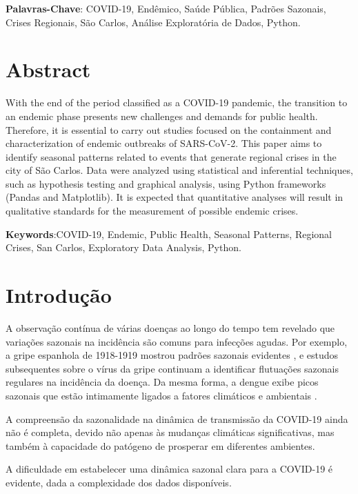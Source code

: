 \documentclass[a4paper,12pt]{report}
\begin{document}
\vspace{0.5cm}
\noindent \textbf{Palavras-Chave}: COVID-19, Endêmico, Saúde Pública, Padrões Sazonais, Crises Regionais, São Carlos, Análise Exploratória de Dados, Python.

\chapter*{Abstract}
 With the end of the period classified as a COVID-19 pandemic, the transition to an endemic phase presents new challenges and demands for public health. Therefore, it is essential to carry out studies focused on the containment and characterization of endemic outbreaks of SARS-CoV-2. This paper aims to identify seasonal patterns related to events that generate regional crises in the city of São Carlos. Data were analyzed using statistical and inferential techniques, such as hypothesis testing and graphical analysis, using Python frameworks (Pandas and Matplotlib). It is expected that quantitative analyses will result in qualitative standards for the measurement of possible endemic crises. 

\vspace{0.5cm}
\noindent \textbf{Keywords}:COVID-19, Endemic, Public Health, Seasonal Patterns, Regional Crises, San Carlos, Exploratory Data Analysis, Python. 

\tableofcontents

\chapter*{Introdução}
\label{chap:introducao}
A observação contínua de várias doenças ao longo do tempo tem revelado que variações sazonais na incidência são comuns para infecções agudas. Por exemplo, a gripe espanhola de 1918-1919 mostrou padrões sazonais evidentes \cite{taubenberger2006} , e estudos subsequentes sobre o vírus da gripe continuam a identificar flutuações sazonais regulares na incidência da doença. Da mesma forma, a dengue exibe picos sazonais que estão intimamente ligados a fatores climáticos e ambientais \cite{johansson2009}.

A compreensão da sazonalidade na dinâmica de transmissão da COVID-19 ainda não é completa, devido não apenas às mudanças climáticas significativas, mas também à capacidade do patógeno de prosperar em diferentes ambientes.

A dificuldade em estabelecer uma dinâmica sazonal clara para a COVID-19 é evidente, dada a complexidade dos dados disponíveis\cite{andrade2022sazonalidade}.
\end{document}
